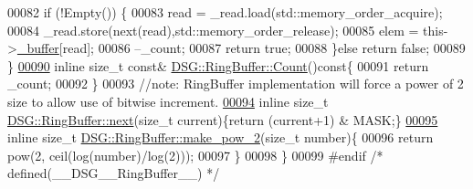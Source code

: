 \begin{DoxyCode}
00082         \textcolor{keywordflow}{if} (!Empty()) \{
00083             read = \_read.load(std::memory\_order\_acquire);
00084             \_read.store(next(read),std::memory\_order\_release);
00085             elem = this->\hyperlink{_driver_8cpp_acce4d24812914a6b276156d1a3d3e851}{\_buffer}[read];
00086             --\_count;
00087             \textcolor{keywordflow}{return} \textcolor{keyword}{true};
00088         \}\textcolor{keywordflow}{else} \textcolor{keywordflow}{return} \textcolor{keyword}{false};
00089     \}
\hypertarget{_ring_buffer_8h_source_l00090}{}\hyperlink{class_d_s_g_1_1_ring_buffer_a9bd79b0a6dff618b205e396c101ee070}{00090}     \textcolor{keyword}{inline} \textcolor{keywordtype}{size\_t} \textcolor{keyword}{const}& \hyperlink{class_d_s_g_1_1_ring_buffer_a9bd79b0a6dff618b205e396c101ee070}{DSG::RingBuffer::Count}()\textcolor{keyword}{const}\{
00091         \textcolor{keywordflow}{return} \_count;
00092     \}
00093     \textcolor{comment}{//note: RingBuffer implementation will force a power of 2 size to allow use of bitwise increment.}
\hypertarget{_ring_buffer_8h_source_l00094}{}\hyperlink{class_d_s_g_1_1_ring_buffer_a6d7a76a4c9b38ccde46344662e08c9e5}{00094}     \textcolor{keyword}{inline} \textcolor{keywordtype}{size\_t} \hyperlink{class_d_s_g_1_1_ring_buffer_a6d7a76a4c9b38ccde46344662e08c9e5}{DSG::RingBuffer::next}(\textcolor{keywordtype}{size\_t} current)\{\textcolor{keywordflow}{return} (current+1) & MASK;\}
\hypertarget{_ring_buffer_8h_source_l00095}{}\hyperlink{class_d_s_g_1_1_ring_buffer_aaf481e139011e91b111cc048e726cafb}{00095}     \textcolor{keyword}{inline} \textcolor{keywordtype}{size\_t} \hyperlink{class_d_s_g_1_1_ring_buffer_aaf481e139011e91b111cc048e726cafb}{DSG::RingBuffer::make\_pow\_2}(\textcolor{keywordtype}{size\_t} number)\{
00096         \textcolor{keywordflow}{return} pow(2, ceil(log(number)/log(2)));
00097     \}
00098 \}
00099 \textcolor{preprocessor}{#endif }\textcolor{comment}{/* defined(\_\_DSG\_\_RingBuffer\_\_) */}\textcolor{preprocessor}{}
\end{DoxyCode}
